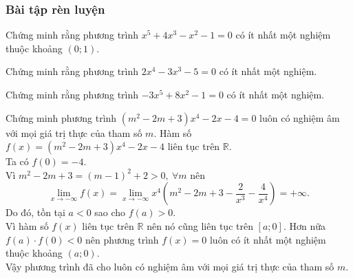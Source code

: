 \subsubsection{Bài tập rèn luyện}
\centerline{}
\begin{bt}[NB]%
Chứng minh rằng phương trình $x^5+4x^3-x^2-1=0$ có ít nhất một nghiệm thuộc khoảng $(0;1)$.
\end{bt}
\begin{bt}[NB]%
		Chứng minh rằng phương trình $ 2x^4-3x^3-5=0 $ có ít nhất một nghiệm.
	\end{bt}
	\begin{bt}[TH]%
Chứng minh rằng phương trình $-3x^5+8x^2-1=0$ có ít nhất một nghiệm.
\end{bt}
\begin{bt}[TH]%
Chứng minh phương trình $\left(m^2-2m+3\right)x^4-2x-4=0$ luôn có nghiệm âm với mọi giá trị thực của tham số $m$.
\loigiai
{Hàm số $f(x)=\left(m^2-2m+3\right)x^4-2x-4$ liên tục trên $\mathbb{R}$.\\
Ta có $f(0)=-4$.\\
Vì $m^2-2m+3=(m-1)^2+2>0,\ \forall m$ nên $$\lim\limits_{x\to -\infty} f(x)=\lim\limits_{x\to -\infty} x^4\left(m^2-2m+3-\dfrac{2}{x^3}-\dfrac{4}{x^4}\right)=+\infty.$$
Do đó, tồn tại $a<0$ sao cho $f(a)>0$.\\
Vì hàm số $f(x)$ liên tục trên $\mathbb{R}$ nên nó cũng liên tục trên $[a; 0]$. Hơn nữa $f(a)\cdot f(0)<0$ nên phương trình $f(x)=0$ luôn có ít nhất một nghiệm thuộc khoảng $(a; 0)$.\\
Vậy phương trình đã cho luôn có nghiệm âm với mọi giá trị thực của tham số $m$.
}
\end{bt}

